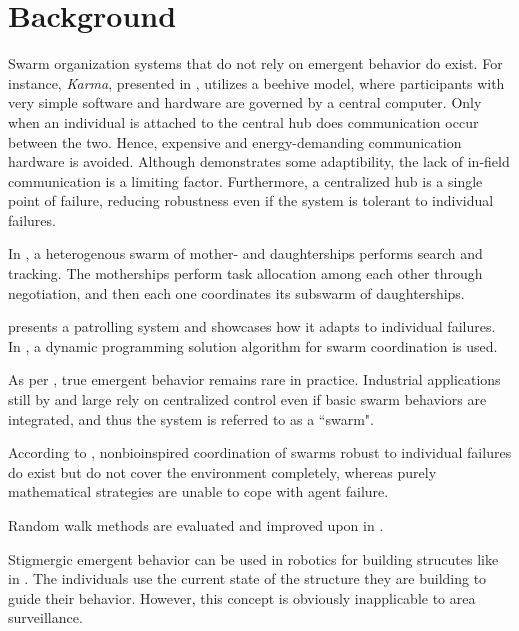 \section{Background}
\par Swarm organization systems that do not rely on emergent behavior do exist. For instance, \textit{Karma}, presented in \parencite{dantu_programming_2011}, utilizes a beehive model, where participants with very simple software and hardware are governed by a central computer. Only when an individual is attached to the central hub does communication occur between the two. Hence, expensive and energy-demanding communication hardware is avoided. Although \parencite{dantu_programming_2011} demonstrates some adaptibility, the lack of in-field communication is a limiting factor. Furthermore, a centralized hub is a single point of failure, reducing robustness even if the system is tolerant to individual failures. 
\par In \parencite{elston_hierarchical_2008}, a heterogenous swarm of mother- and daughterships performs search and tracking. The motherships perform task allocation among each other through negotiation, and then each one coordinates its subswarm of daughterships.
\par \parencite{marino_fault-tolerant_2009} presents a patrolling system and showcases how it adapts to individual failures.
In \parencite{flint_cooperative_2002}, a dynamic programming solution algorithm for swarm coordination is used.
\par As per \parencite{schranz_swarm_2020}, true emergent behavior remains rare in practice. Industrial applications still by and large rely on centralized control even if basic swarm behaviors are integrated, and thus the system is referred to as a ``swarm".
\par According to \parencite{calvo_bio-inspired_2011}, nonbioinspired coordination of swarms robust to individual failures do exist but do not cover the environment completely, whereas purely mathematical strategies are unable to cope with agent failure.
\par Random walk methods are evaluated and improved upon in \parencite{pang_swarm_2019}.
\par Stigmergic emergent behavior can be used in robotics for building strucutes like in \parencite{werfel_designing_2014}. The individuals use the current state of the structure they are building to guide their behavior. However, this concept is obviously inapplicable to area surveillance.
